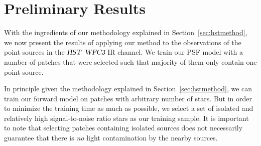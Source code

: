 
%




\section{Preliminary Results}\label{sec:hstresults}

With the ingredients of our methodology explained in Section~\ref{sec:hstmethod}, we now present the results of applying our 
method to the observations of the point sources in the ${\textsl{HST}}$ ${\textsl{WFC3}}$ IR channel. We train our PSF model with a number of 
patches that were selected such that majority of them only contain one point source. 

In principle given the methodology explained in Section~\ref{sec:hstmethod}, we can train our forward model on patches with arbitrary 
number of stars. But in order to minimize the training time as much as possible, we select a set of isolated and 
relatively high signal-to-noise ratio stars as our training sample.
It is important to note that selecting patches containing isolated sources does not necessarily guarantee that there is \emph{no} light contamination 
by the nearby sources. %

